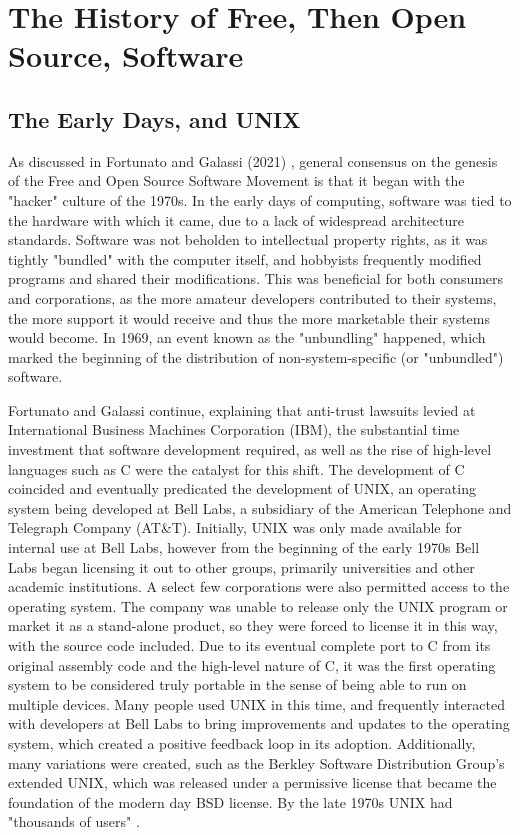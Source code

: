 \documentclass[manuscript,screen,nonacm,12pt]{acmart}
\begin{document}
\section{The History of Free, Then Open Source, Software}
\subsection{The Early Days, and UNIX}
\label{sec:hist-early}
As discussed in Fortunato and Galassi (2021) \cite{Fortunato2021}, general
consensus on the genesis of the Free and Open Source Software Movement is that
it began with the "hacker" culture of the 1970s. In the early days of computing,
software was tied to the hardware with which it came, due to a lack of
widespread architecture standards. Software was not beholden to intellectual
property rights, as it was tightly "bundled" with the computer itself, and
hobbyists frequently modified programs and shared their modifications. This was
beneficial for both consumers and corporations, as the more amateur developers
contributed to their systems, the more support it would receive and thus the
more marketable their systems would become. In 1969, an event known as the
"unbundling" happened, which marked the beginning of the distribution of
non-system-specific (or "unbundled") software.

Fortunato and Galassi \cite{Fortunato2021} continue, explaining that anti-trust
lawsuits levied at International Business Machines Corporation (IBM), the
substantial time investment that software development required, as well as the
rise of high-level languages such as C were the catalyst for this shift. The
development of C coincided and eventually predicated the development of UNIX, an
operating system being developed at Bell Labs, a subsidiary of the American
Telephone and Telegraph Company (AT\&T). Initially, UNIX was only made available
for internal use at Bell Labs, however from the beginning of the early 1970s
Bell Labs began licensing it out to other groups, primarily universities and
other academic institutions. A select few corporations were also permitted
access to the operating system. The company was unable to release only the UNIX
program or market it as a stand-alone product, so they were forced to license it
in this way, with the source code included. Due to its eventual complete port to
C from its original assembly code and the high-level nature of C, it was the
first operating system to be considered truly portable in the sense of being
able to run on multiple devices. Many people used UNIX in this time, and
frequently interacted with developers at Bell Labs to bring improvements and
updates to the operating system, which created a positive feedback loop in its
adoption. Additionally, many variations were created, such as the Berkley
Software Distribution Group's extended UNIX, which was released under a
permissive license that became the foundation of the modern day BSD license. By
the late 1970s UNIX had "thousands of users" \cite{Fortunato2021}.
\end{document}
